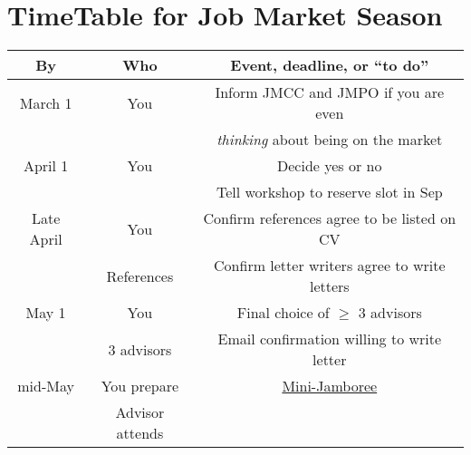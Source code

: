\documentclass{\econtex}
\begin{document}
\thispagestyle{empty}
\renewcommand{\thepage}{} %

\medskip



\section*{\LARGE TimeTable for Job Market Season}


\small
\begin{center}
  \begin{tabular}{|c|c|c|}\hline
    By                 & Who             & Event, deadline, or ``to do''                                                       \\ \hline
    March 1            & You             & Inform JMCC and JMPO if you are even                                                \\
                       &                 &  \textit{thinking} about being on the market                                        \\ \hline
    April 1            & You             & Decide yes or no                                                                    \\
                       &                 & Tell workshop to reserve slot in Sep                                                      \\ \hline
    Late April         & You             & Confirm references agree to be listed on CV                                         \\
                       & References      & Confirm letter writers agree to write letters                                       \\ \hline
    May 1              & You             & Final choice of $\geq$ 3 advisors                                                   \\
                       & 3 advisors      & Email confirmation willing to write letter                                          \\ \hline %
    mid-May            & You prepare     & \href{\jambsurl/README.md#user-content-jamboree-mini-spring}{Mini-Jamboree}         \\
                       & Advisor attends &                                                                                     \\ \hline

\end{tabular}
\end{center}
\end{document}
